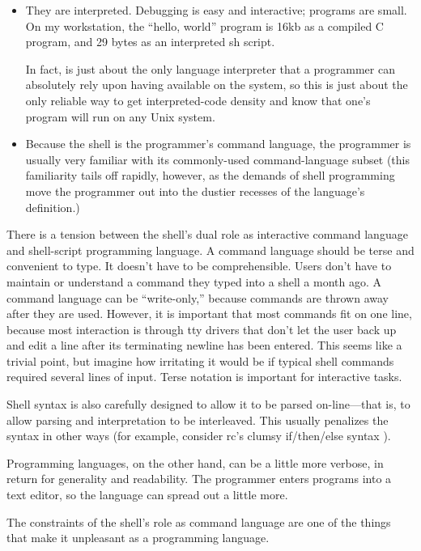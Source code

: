 \begin{itemize}
\item 
  They are interpreted. Debugging is easy and interactive; programs are small.
  On my workstation, the ``hello, world'' program is 16kb as a compiled C
  program, and 29 bytes as an interpreted sh script.

  In fact,  is just about the only language interpreter
  that a programmer can absolutely rely upon having available
  on the system, so this is just about the only reliable way to
  get interpreted-code density and know that one's program
  will run on any Unix system.

\item 
  Because the shell is the programmer's command language, the programmer
  is usually very familiar with its commonly-used command-language
  subset (this familiarity tails off rapidly, however, as the demands
  of shell programming move the programmer out into the dustier recesses
  of the language's definition.)
\end{itemize}

There is a tension between the shell's dual role as interactive command
language and shell-script programming language.  A command language should be
terse and convenient to type. It doesn't have to be comprehensible.  Users
don't have to maintain or understand a command they typed into a shell a month
ago. A command language can be ``write-only,'' because commands are thrown
away after they are used.  However, it is important that most commands fit on
one line, because most interaction is through tty drivers that don't let the
user back up and edit a line after its terminating newline has been entered.
This seems like a trivial point, but imagine how irritating it would be if
typical shell commands required several lines of input. Terse notation is
important for interactive tasks.

Shell syntax is also carefully designed to allow it to be parsed
on-line---that is, to allow parsing and interpretation to be interleaved.
This usually penalizes the syntax in other ways (for example, consider 
rc's clumsy if/then/else syntax \cite{rc}).

Programming languages, on the other hand, can be a little more verbose, in
return for generality and readability. The programmer enters programs into a
text editor, so the language can spread out a little more.

The constraints of the shell's role as command language are one of the
things that make it unpleasant as a programming language. 

